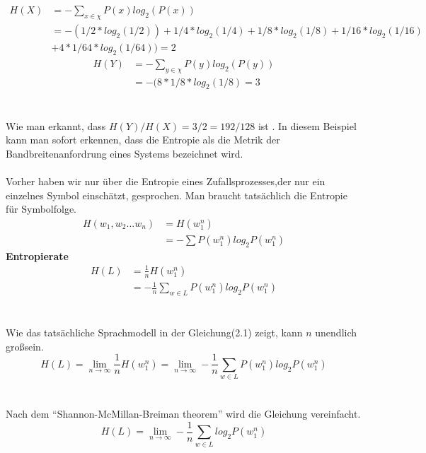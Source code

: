 \begin{align}
H(X) &=-\sum_{x\in\chi}P(x)log_{2}(P(x))\nonumber \\
		 &=-(1/2*log_{2}(1/2))+1/4*log_{2}(1/4)+1/8*log_{2}(1/8)+1/16*log_{2}(1/16)\nonumber \\
		 &+4*1/64*log_{2}(1/64))=2
\end{align}
\begin{align}
H(Y)&=-\sum_{y\in\chi}P(y)log_{2}(P(y))\\
	  &=-(8*1/8*log_{2}(1/8)=3
\end{align}
\\
\\
Wie man erkannt, dass $H(Y)/H(X)=3/2=192/128$ ist . In diesem Beispiel kann man sofort erkennen, dass die Entropie als die Metrik der Bandbreitenanfordrung eines Systems bezeichnet wird.
\\
\\   
Vorher haben wir nur \"uber die Entropie eines Zufallsprozesses,der nur ein einzelnes Symbol einsch\"atzt, gesprochen. Man braucht tats\"achlich die Entropie f\"ur Symbolfolge.
\begin{align}
H(w_{1},w_{2}...w_{n})&=H(w_{1}^{n})\nonumber \\
											&=-\sum{P(w_{1}^{n})log_{2}P(w_{1}^{n})}
\end{align}
\textbf{Entropierate}
\begin{align}
H(L)&=\frac{1}{n}H(w_{1}^{n})\nonumber \\
		&=-\frac{1}{n}\sum_{w\in L}P(w_{1}^{n})log_{2}P(w_{1}^{n})
\end{align}
\\
\\
Wie das tats\"achliche Sprachmodell in der Gleichung(2.1) zeigt, kann $n$ unendlich gro\ss \space sein.
\begin{equation}
H(L)=\lim_{n\to\infty}\frac{1}{n}H(w_{1}^{n})=\lim_{n\to\infty}-\frac{1}{n}\sum_{w\in L}P(w_{1}^{n})log_{2}P(w_{1}^{n})
\end{equation}
\\
\\
Nach dem "`Shannon-McMillan-Breiman theorem"' wird die Gleichung vereinfacht.
\begin{equation}
H(L)=\lim_{n\to\infty}-\frac{1}{n}\sum_{w\in L}log_{2}P(w_{1}^{n})
\end{equation}
\\
\\
